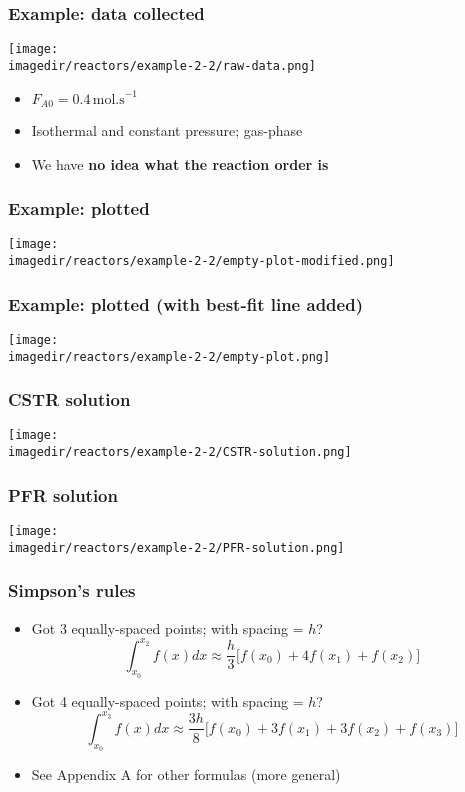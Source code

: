 \begin{frame}\frametitle{Example: data collected}
	\begin{center}
		\texttt{[image: \\imagedir/reactors/example-2-2/raw-data.png]}
	\end{center}
	\vfill
	\begin{itemize}
		\item	$F_{A0} = 0.4\,\text{mol.s}^{-1}$
		\item	Isothermal and constant pressure; gas-phase
		\item	We have \textbf{no idea what the reaction order is}
	\end{itemize}
	\vspace{96pt}
	
\end{frame}

\begin{frame}\frametitle{Example: plotted}
	\begin{center}
		\texttt{[image: \\imagedir/reactors/example-2-2/empty-plot-modified.png]}
	\end{center}
\end{frame}

\begin{frame}\frametitle{Example: plotted (with best-fit line added)}
	\begin{center}
		\texttt{[image: \\imagedir/reactors/example-2-2/empty-plot.png]}
	\end{center}
\end{frame}

\begin{frame}\frametitle{CSTR solution}
	\begin{center}
		\texttt{[image: \\imagedir/reactors/example-2-2/CSTR-solution.png]}
	\end{center}
\end{frame}

\begin{frame}\frametitle{PFR solution}
	\begin{center}
		\texttt{[image: \\imagedir/reactors/example-2-2/PFR-solution.png]}
	\end{center}
\end{frame}

\begin{frame}\frametitle{Simpson's rules}
	\begin{itemize}
		\item	Got 3 equally-spaced points; with spacing = $h$?
				$$ \int_{x_0}^{x_2} f(x) dx \approx \dfrac{h}{3}\Biggl[f(x_0) + 4f(x_1) + f(x_2) \Biggr]$$
		\vspace{12pt}
		\item	Got 4 equally-spaced points; with spacing = $h$?
				$$ \int_{x_0}^{x_3} f(x) dx \approx \dfrac{3h}{8}\Biggl[f(x_0) + 3f(x_1) + 3f(x_2) + f(x_3)\Biggr]$$
		\vspace{12pt}
		\item	\small See Appendix A for other formulas (more general)
	\end{itemize}
	
\end{frame}

